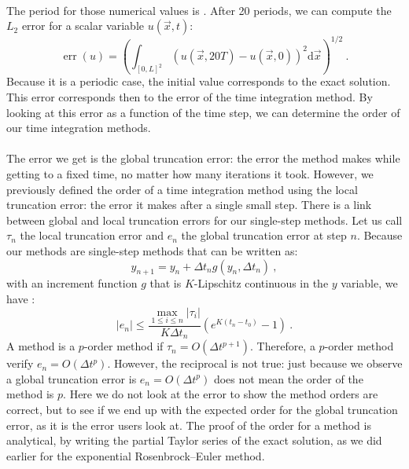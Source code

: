       \paragraph{}
      The period for those numerical values is .
      After 20 periods, we can compute the $L_2$ error for a scalar variable $u\left(\vec{x}, t\right)$:
      \begin{equation}
        \operatorname{err}\left(u\right) = \left(\int_{\left[0, L\right]^2} \left(u\left(\vec{x}, 20T\right) - u\left(\vec{x}, 0\right)\right)^2 \mathrm{d}\vec{x} \right)^{1/2} \ .
      \end{equation}
      Because it is a periodic case, the initial value corresponds to the exact solution.
      This error corresponds then to the error of the time integration method.
      By looking at this error as a function of the time step, we can determine the order of our time integration methods.

      \paragraph{}
      The error we get is the global truncation error: the error the method makes while getting to a fixed time, no matter how many iterations it took.
      However, we previously defined the order of a time integration method using the local truncation error: the error it makes after a single small step.
      There is a link between global and local truncation errors for our single-step methods.
      Let us call $\tau_n$ the local truncation error and $e_n$ the global truncation error at step $n$.
      Because our methods are single-step methods that can be written as:
      \begin{equation}
        y_{n+1} = y_n + \Delta t_n g\left(y_n, \Delta t_n\right) \ ,
      \end{equation}
      with an increment function $g$ that is $K$-Lipschitz continuous in the $y$ variable, we have \cite{SueliMayers2003}:
      \begin{equation}
        \left| e_n \right| \leq \frac{\max_{1 \leq i \leq n} \left| \tau_i \right|}{K \Delta t_n} \left(e^{K\left(t_n - t_0\right)} - 1\right) \ .
      \end{equation}
      A method is a $p$-order method if $\tau_n = O\left(\Delta t^{p+1}\right)$.
      Therefore, a $p$-order method verify $e_n = O\left(\Delta t^{p}\right)$.
      However, the reciprocal is not true: just because we observe a global truncation error is $e_n = O\left(\Delta t^{p}\right)$ does not mean the order of the method is $p$.
      Here we do not look at the error to show the method orders are correct, but to see if we end up with the expected order for the global truncation error, as it is the error users look at.
      The proof of the order for a method is analytical, by writing the partial Taylor series of the exact solution, as we did earlier for the exponential Rosenbrock--Euler method.

